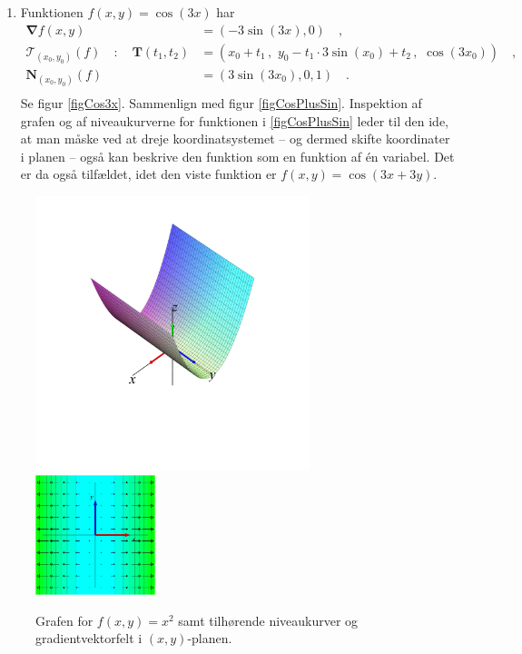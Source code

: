 \begin{example}
\begin{enumerate}
\item Funktionen $f(x,y) = \cos(3x)$ har
\begin{equation}
\begin{aligned}
{\bm{\nabla}}f(x,y) &= (- 3\sin(3x), 0) \quad ,\\
\mathcal{T}_{(x_{0}, y_{0})}(f) \quad : \quad \mathbf{T}(t_{1}, t_{2}) &= (x_{0} + t_{1}\, , \,\, y_{0} - t_{1}\cdot 3\sin(x_{0}) + t_{2}\, , \, \, \cos(3x_{0}))\quad ,\\
\mathbf{N}_{(x_{0}, y_{0})}(f) &= (3\sin(3x_{0}), 0, 1) \quad .\\
\end{aligned}
\end{equation}
 Se figur \ref{figCos3x}. Sammenlign med figur \ref{figCosPlusSin}. Inspektion af grafen og af niveaukurverne for funktionen i \ref{figCosPlusSin} leder til den ide, at man måske ved at dreje koordinatsystemet -- og dermed skifte koordinater i planen -- også  kan beskrive den funktion som en funktion af \'{e}n variabel. Det er da også tilfældet, idet
den viste funktion er $f(x,y) = \cos(3x + 3y)$.
\end{enumerate}
\end{example}

\begin{figure}[ht]
\centerline{\includegraphics[height=80mm]{plotXianden.pdf} \quad \includegraphics[height=35mm]{plotGradXianden.pdf}}
\begin{center}
\caption{Grafen  for $f(x,y) = x^{2}$ samt tilhørende niveaukurver og gradientvektorfelt i $(x,y)$-planen.} \label{figXianden}
\end{center}
\end{figure}

